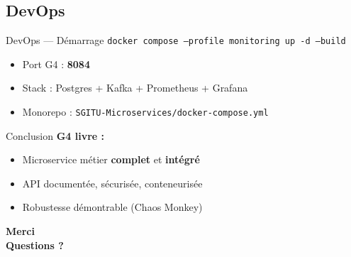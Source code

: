 \documentclass[aspectratio=169,xcolor=table]{beamer}
\begin{document}
\subsection{DevOps}

\begin{frame}{DevOps — Démarrage}
  \footnotesize
  \texttt{docker compose --profile monitoring up -d --build}
  \vspace{0.3cm}
  \begin{itemize}
    \item Port G4 : \textbf{8084}
    \item Stack : Postgres + Kafka + Prometheus + Grafana
    \item Monorepo : \texttt{SGITU-Microservices/docker-compose.yml}
  \end{itemize}
\end{frame}

\begin{frame}{Conclusion}
  \textbf{G4 livre :}
  \begin{itemize}
    \item Microservice métier \textbf{complet} et \textbf{intégré}
    \item API documentée, sécurisée, conteneurisée
    \item Robustesse démontrable (Chaos Monkey)
  \end{itemize}
\end{frame}

\begin{frame}
  \centering
  \vspace{2cm}
  \textbf{\Huge Merci}
  \\
  \textbf{\Large Questions ?}
  \\
  \vspace{1cm}
  \vspace{2cm}
\end{frame}
\end{document}

